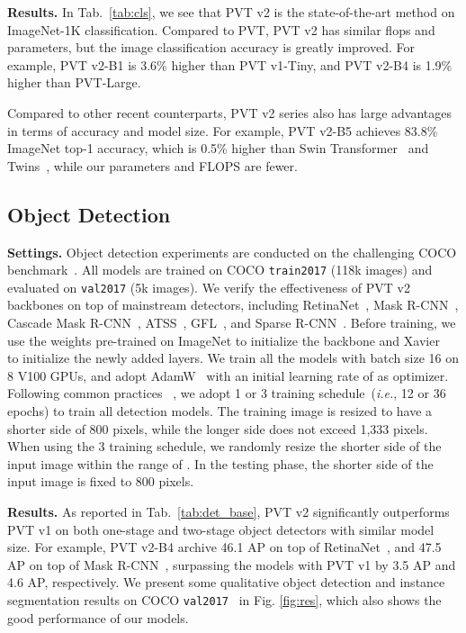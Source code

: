 \documentclass[10pt,twocolumn,letterpaper]{article}
\def\ie{\emph{i.e.}}
\begin{document}
	
	
	
	
	\noindent\textbf{Results.}
	In Tab.~\ref{tab:cls}, we see that PVT v2 is the state-of-the-art method on ImageNet-1K classification.
Compared to PVT, PVT v2 has similar flops and parameters, but the image classification accuracy is greatly improved. For example, PVT v2-B1 is 3.6\% higher than PVT v1-Tiny, and PVT v2-B4 is 1.9\% higher than PVT-Large.
	
	Compared to other recent counterparts, PVT v2 series also has large advantages in terms of accuracy and model size. For example, PVT v2-B5 achieves 83.8\% ImageNet top-1 accuracy, which is 0.5\% higher than Swin Transformer~\cite{swin} and Twins~\cite{twins}, while our parameters and FLOPS are fewer.
	
	
	\subsection{Object Detection}
	\noindent\textbf{Settings.}
	Object detection experiments are conducted on the challenging COCO benchmark~\cite{lin2014microsoft}.
	All models are trained on COCO \texttt{train2017} (118k images) and evaluated on \texttt{val2017} (5k images).
We verify the effectiveness of PVT v2 backbones on top of mainstream detectors, including RetinaNet~\cite{lin2017focal}, Mask R-CNN~\cite{he2017mask}, Cascade Mask R-CNN~\cite{cai2018cascade}, ATSS~\cite{zhang2020bridging}, GFL~\cite{li2020generalized}, and Sparse R-CNN~\cite{sun2020sparse}.
	Before training, we use the weights pre-trained on ImageNet to initialize the backbone and Xavier~\cite{glorot2010understanding} to initialize the newly added layers.
We train all the models with  batch size 16 on 8 V100 GPUs, and adopt AdamW~\cite{loshchilov2017decoupled} with an initial learning rate of  as optimizer.
Following common practices~ \cite{lin2017focal,he2017mask,chen2019mmdetection}, we adopt 1 or 3 training schedule~(\ie, 12 or 36 epochs) to train all detection models.
The training image is resized to have a shorter side of 800 pixels, while the longer side does not exceed 1,333 pixels.
When using the 3 training schedule, we randomly resize the shorter side of the input image within the range of .
In the testing phase, the shorter side of the input image is fixed to 800 pixels.
	
	
	
	\noindent\textbf{Results.}
	As reported in Tab.~\ref{tab:det_base}, PVT v2 significantly outperforms PVT v1 on both one-stage and two-stage object detectors with similar model size.
For example, PVT v2-B4 archive 46.1 AP on top of RetinaNet~\cite{lin2017focal}, and 47.5 AP on top of Mask R-CNN~\cite{he2017mask}, surpassing the models with PVT v1 by 3.5 AP and 4.6 AP, respectively.
We present some qualitative object detection and instance segmentation results on COCO \texttt{val2017}~\cite{lin2014microsoft} in Fig. \ref{fig:res}, which also shows the good performance of our models.
	
\end{document}
